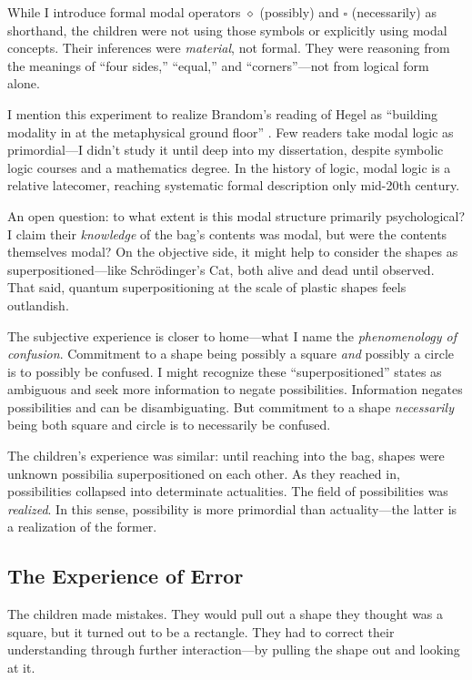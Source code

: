 \documentclass[12pt]{book}
\begin{document}
While I introduce formal modal operators \(\diamond\) (possibly) and \(\square\) (necessarily) as shorthand, the children were not using those symbols or explicitly using modal concepts. Their inferences were \emph{material}, not formal. They were reasoning from the meanings of ``four sides,'' ``equal,'' and ``corners''---not from logical form alone.

I mention this experiment to realize Brandom's reading of Hegel as ``building modality in at the metaphysical ground floor'' \parencite[144-145]{Brandom:2019aa}. Few readers take modal logic as primordial---I didn't study it until deep into my dissertation, despite symbolic logic courses and a mathematics degree. In the history of logic, modal logic is a relative latecomer, reaching systematic formal description only mid-20th century.

An open question: to what extent is this modal structure primarily psychological? I claim their \emph{knowledge} of the bag's contents was modal, but were the contents themselves modal? On the objective side, it might help to consider the shapes as superpositioned---like Schrödinger's Cat, both alive and dead until observed. That said, quantum superpositioning at the scale of plastic shapes feels outlandish.

The subjective experience is closer to home---what I name the \emph{phenomenology of confusion}. Commitment to a shape being possibly a square \emph{and} possibly a circle is to possibly be confused. I might recognize these ``superpositioned'' states as ambiguous and seek more information to negate possibilities. Information negates possibilities and can be disambiguating. But commitment to a shape \emph{necessarily} being both square and circle is to necessarily be confused.

The children's experience was similar: until reaching into the bag, shapes were unknown possibilia superpositioned on each other. As they reached in, possibilities collapsed into determinate actualities. The field of possibilities was \emph{realized}. In this sense, possibility is more primordial than actuality---the latter is a realization of the former.

\subsection*{The Experience of Error}\label{the-experience-of-error}

The children made mistakes. They would pull out a shape they thought was a square, but it turned out to be a rectangle. They had to correct their understanding through further interaction---by pulling the shape out and looking at it.
\end{document}
